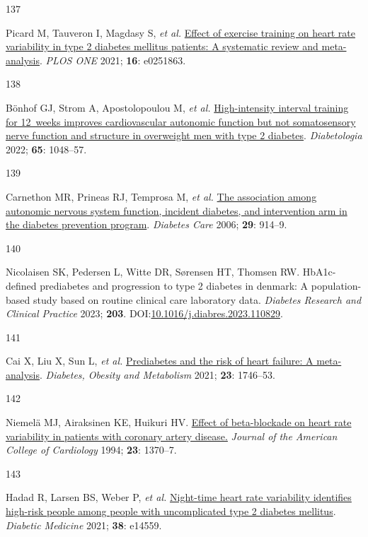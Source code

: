 \documentclass[
  letterpaper,
  headsepline=true,
  open=any]{scrbook}
\newlength{\cslhangindent}
\newlength{\csllabelwidth}
\newlength{\cslentryspacingunit} %
\newenvironment{CSLReferences}[2] %
 {%
  \setlength{\parindent}{0pt}
  \ifodd #1
  \let\oldpar\par
  \def\par{\hangindent=\cslhangindent\oldpar}
  \fi
  \setlength{\parskip}{#2\cslentryspacingunit}
 }%
 {}
\newcommand{\CSLLeftMargin}[1]{\parbox[t]{\csllabelwidth}{#1}}
\newcommand{\CSLRightInline}[1]{\parbox[t]{\linewidth - \csllabelwidth}{#1}\break}
\begin{document}
\begin{CSLReferences}{0}{0}
\leavevmode{}%
\CSLLeftMargin{137 }%
\CSLRightInline{Picard M, Tauveron I, Magdasy S, \emph{et al.}
\href{https://doi.org/10.1371/journal.pone.0251863}{Effect of exercise
training on heart rate variability in type 2 diabetes mellitus patients:
A systematic review and meta-analysis}. \emph{PLOS ONE} 2021;
\textbf{16}: e0251863.}

\leavevmode{}%
\CSLLeftMargin{138 }%
\CSLRightInline{Bönhof GJ, Strom A, Apostolopoulou M, \emph{et al.}
\href{https://doi.org/10.1007/s00125-022-05674-w}{High-intensity
interval training for 12~weeks improves cardiovascular autonomic
function but not somatosensory nerve function and structure in
overweight men with type 2 diabetes}. \emph{Diabetologia} 2022;
\textbf{65}: 1048--57.}

\leavevmode{}%
\CSLLeftMargin{139 }%
\CSLRightInline{Carnethon MR, Prineas RJ, Temprosa M, \emph{et al.}
\href{https://doi.org/10.2337/diacare.29.04.06.dc05-1729}{The
association among autonomic nervous system function, incident diabetes,
and intervention arm in the diabetes prevention program}. \emph{Diabetes
Care} 2006; \textbf{29}: 914--9.}

\leavevmode{}%
\CSLLeftMargin{140 }%
\CSLRightInline{Nicolaisen SK, Pedersen L, Witte DR, Sørensen HT,
Thomsen RW. HbA1c-defined prediabetes and progression to type 2 diabetes
in denmark: A population-based study based on routine clinical care
laboratory data. \emph{Diabetes Research and Clinical Practice} 2023;
\textbf{203}.
DOI:\href{https://doi.org/10.1016/j.diabres.2023.110829}{10.1016/j.diabres.2023.110829}.}

\leavevmode{}%
\CSLLeftMargin{141 }%
\CSLRightInline{Cai X, Liu X, Sun L, \emph{et al.}
\href{https://doi.org/10.1111/dom.14388}{Prediabetes and the risk of
heart failure: A meta-analysis}. \emph{Diabetes, Obesity and Metabolism}
2021; \textbf{23}: 1746--53.}

\leavevmode{}%
\CSLLeftMargin{142 }%
\CSLRightInline{Niemelä MJ, Airaksinen KE, Huikuri HV.
\href{https://doi.org/10.1016/0735-1097(94)90379-4}{Effect of
beta-blockade on heart rate variability in patients with coronary artery
disease.} \emph{Journal of the American College of Cardiology} 1994;
\textbf{23}: 1370--7.}

\leavevmode{}%
\CSLLeftMargin{143 }%
\CSLRightInline{Hadad R, Larsen BS, Weber P, \emph{et al.}
\href{https://doi.org/10.1111/dme.14559}{Night-time heart rate
variability identifies high-risk people among people with uncomplicated
type 2 diabetes mellitus}. \emph{Diabetic Medicine} 2021; \textbf{38}:
e14559.}


\end{CSLReferences}
\end{document}

